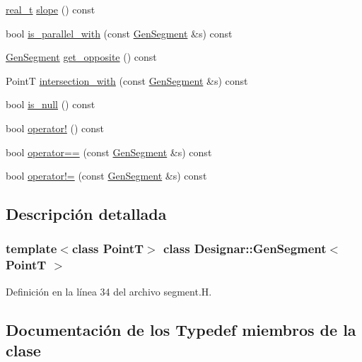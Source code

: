 \begin{DoxyCompactItemize}
\item 
\hyperlink{namespace_designar_aca2c32af26808dbec1f3a3071fad25ce}{real\+\_\+t} \hyperlink{class_designar_1_1_gen_segment_a02652b0274b3b597fb588d83d424b4bd}{slope} () const
\item 
bool \hyperlink{class_designar_1_1_gen_segment_ad599fb23aec1fda6432c984d7e261e53}{is\+\_\+parallel\+\_\+with} (const \hyperlink{class_designar_1_1_gen_segment}{Gen\+Segment} \&s) const
\item 
\hyperlink{class_designar_1_1_gen_segment}{Gen\+Segment} \hyperlink{class_designar_1_1_gen_segment_a0be16262e7398c8197b630d79cc90323}{get\+\_\+opposite} () const
\item 
PointT \hyperlink{class_designar_1_1_gen_segment_a50669847e6727a598ad75ea8b2339852}{intersection\+\_\+with} (const \hyperlink{class_designar_1_1_gen_segment}{Gen\+Segment} \&s) const
\item 
bool \hyperlink{class_designar_1_1_gen_segment_a812f6f7754064269eef82abc6091b818}{is\+\_\+null} () const
\item 
bool \hyperlink{class_designar_1_1_gen_segment_a49f01b575b3813da44a68e4565d99994}{operator!} () const
\item 
bool \hyperlink{class_designar_1_1_gen_segment_a2e6b2f583c4323af75351aef09528a7a}{operator==} (const \hyperlink{class_designar_1_1_gen_segment}{Gen\+Segment} \&s) const
\item 
bool \hyperlink{class_designar_1_1_gen_segment_a449cfcd9f6f6ac5d013e29ae572190c4}{operator!=} (const \hyperlink{class_designar_1_1_gen_segment}{Gen\+Segment} \&s) const
\end{DoxyCompactItemize}


\subsection{Descripción detallada}
\subsubsection*{template$<$class PointT$>$\newline
class Designar\+::\+Gen\+Segment$<$ Point\+T $>$}



Definición en la línea 34 del archivo segment.\+H.



\subsection{Documentación de los \textquotesingle{}Typedef\textquotesingle{} miembros de la clase}
\mbox{\label{class_designar_1_1_gen_segment_a411a0e6d28251be878c23ad4dbec71bb}} 
